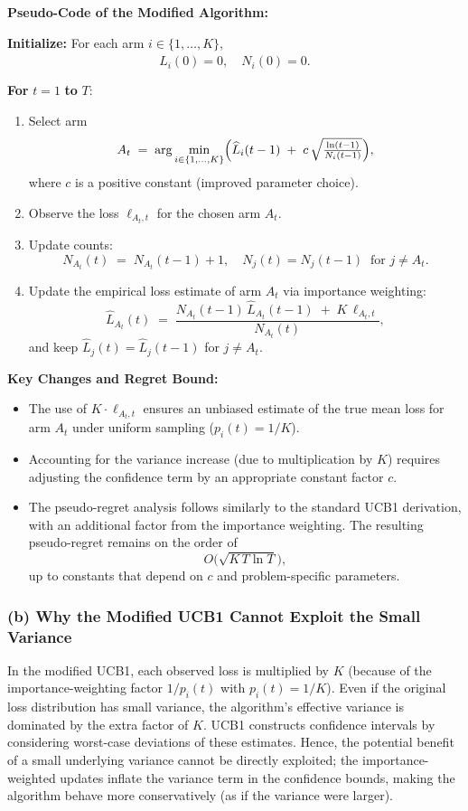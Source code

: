 \medskip
\textbf{Pseudo-Code of the Modified Algorithm:}

\bigskip
\noindent
\textbf{Initialize:} For each arm $i \in \{1,\dots,K\}$,
\[
    \widehat{L}_i(0) = 0,\quad N_i(0) = 0.
\]

\medskip
\noindent
\textbf{For} $t = 1$ \textbf{to} $T$:
\begin{enumerate}
    \item Select arm 
    \[
        A_t \;=\; \arg\min_{i \in \{1,\dots,K\}} \Bigl(\widehat{L}_i(t-1) \;+\; c \,\sqrt{\tfrac{\ln(t-1)}{N_i(t-1)}}\Bigr),
    \]
    where $c$ is a positive constant (improved parameter choice).
    \item Observe the loss $\ell_{A_t,t}$ for the chosen arm $A_t$.
    \item Update counts:
    \[
        N_{A_t}(t) \;=\; N_{A_t}(t-1) + 1,\quad N_j(t) = N_j(t-1)\;\;\text{for } j \neq A_t.
    \]
    \item Update the empirical loss estimate of arm $A_t$ via importance weighting:
    \[
        \widehat{L}_{A_t}(t) \;=\; \frac{N_{A_t}(t-1)\,\widehat{L}_{A_t}(t-1)\;+\;K \,\ell_{A_t,t}}{N_{A_t}(t)},
    \]
    and keep $\widehat{L}_j(t) = \widehat{L}_j(t-1)$ for $j \neq A_t$.
\end{enumerate}

\bigskip
\noindent
\textbf{Key Changes and Regret Bound:} 
\begin{itemize}
    \item The use of $K \cdot \ell_{A_t,t}$ ensures an unbiased estimate of the true mean loss for arm $A_t$ under uniform sampling ($p_i(t) = 1/K$).
    \item Accounting for the variance increase (due to multiplication by $K$) requires adjusting the confidence term by an appropriate constant factor $c$. 
    \item The pseudo-regret analysis follows similarly to the standard UCB1 derivation, with an additional factor from the importance weighting. The resulting pseudo-regret remains on the order of 
    \[
        O\bigl(\sqrt{K\,T \ln T}\bigr),
    \]
    up to constants that depend on $c$ and problem-specific parameters.
\end{itemize}

\noindent
\subsubsection*{(b) Why the Modified UCB1 Cannot Exploit the Small Variance}

In the modified UCB1, each observed loss is multiplied by $K$ (because of the importance-weighting factor $1/p_i(t)$ with $p_i(t) = 1/K$). 
Even if the original loss distribution has small variance, the algorithm's effective variance is dominated by the extra factor of $K$. 
UCB1 constructs confidence intervals by considering worst-case deviations of these estimates. 
Hence, the potential benefit of a small underlying variance cannot be directly exploited; 
the importance-weighted updates inflate the variance term in the confidence bounds, 
making the algorithm behave more conservatively (as if the variance were larger).


